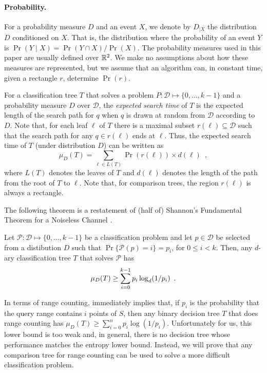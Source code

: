 \documentclass[lotsofwhite,charterfonts]{patmorin}
\newcommand{\depth}{d}
\begin{document}
\paragraph{Probability.}

For a probability measure $D$ and an event $X$, we denote by $D_{|X}$ the
distribution $D$ conditioned on $X$.  That is, the distribution where
the probability of an event $Y$ is $\Pr(Y\mid X)=\Pr(Y\cap X)/\Pr(X)$.
The probability measures used in this paper are usually defined over
$\mathbb{R}^2$.  We make no assumptions about how these measures are
represented, but we assume that an algorithm can, in constant time,
given a rectangle $r$, determine $\Pr(r)$.

For a classification tree $T$ that solves a problem
$P:\mathcal{D}\mapsto\{0,\ldots,k-1\}$ and a probability measure $D$
over $\mathcal{D}$, the \emph{expected search time} of $T$ is the
expected length of the search path for $q$ when $q$ is drawn at random
from $\mathcal{D}$ according to $D$.  Note that, for each leaf $\ell$
of $T$ there is a maximal subset $r(\ell)\subseteq \mathcal{D}$ such
that the search path for any $q\in r(\ell)$ ends at $\ell$.  Thus, the
expected search time of $T$ (under distribution $D$) can be written as
\[
     \mu_D(T) = \sum_{\ell\in L(T)} \Pr(r(\ell))\times \depth(\ell)
	\enspace ,
\]
where $L(T)$ denotes the leaves of $T$ and $\depth(\ell)$ denotes the
length of the path from the root of $T$ to $\ell$.  Note that, for comparison
trees, the region $r(\ell)$ is always a rectangle.

The following theorem is a restatement of (half of) Shannon's
Fundamental Theorem for a Noiseless Channel \cite[Theorem 9]{s48}.

\begin{thm}
Let $\mathcal{P}:\mathcal{D}\mapsto \{0,\ldots,k-1\}$ be a classification
problem and let $p\in \mathcal{D}$ be selected from a distibution $D$ such
that $\Pr\{\mathcal{P}(p)= i\}=p_i$, for $0\le i< k$.  Then, any
$d$-ary classification tree $T$ that solves $\mathcal{P}$ has
\begin{equation}
     \mu_D(T) \ge \sum_{i=0}^{k-1} p_i\log_d(1/p_i) \enspace .
	\eqlabel{shannon}
\end{equation}
\end{thm}

In terms of range counting,  immediately implies that,
if $p_i$ is the probability that the query range contains $i$ points
of $S$, then any binary decision tree $T$ that does range counting has
$\mu_D(T) \ge \sum_{i=0}^{n} p_i\log(1/p_i)$.  Unfortunately for us,
this lower bound is too weak and, in general, there is no decision
tree whose performance matches the entropy lower bound.
Instead, we will prove that any comparison tree for range counting
can be used to solve a more difficult classification problem.
\end{document}
